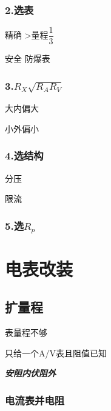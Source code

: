 \documentclass[10pt,cn]{elegantbook}
\begin{document}
					\subsubsection*{2.选表}
					
					精确  >量程$\dfrac{1}{3}$
					
					安全  防爆表
					
						\subsubsection*{3.$R_{X}\sqrt{R_{A}R_{V}}$}
						
						大内偏大
						
						小外偏小
						
							\subsubsection*{4.选结构}
							
							分压
							
							
							限流
							
								\subsubsection*{5.选$R_{p}$}
								
								
								
						\section{电表改装}
						
						\subsection{扩量程}
						
						
							表量程不够
						
						只给一个A/V表且阻值已知
						
						\textit{\textbf{安阻内伏阻外}}
						
						
						\subsubsection{电流表并电阻}
						
\end{document}
